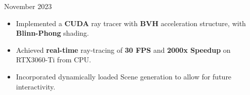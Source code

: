 \documentclass[10pt,a4paper,ragged2e,withhyper]{altacv}
\begin{document}
\begin{paracol}{2}












    {November 2023 
    }{}
    \begin{itemize}
        \item Implemented a \textbf{CUDA} ray tracer with \textbf{BVH} acceleration structure, with \textbf{Blinn-Phong} shading.
        \item Achieved \textbf{real-time} ray-tracing of \textbf{30 FPS} and \textbf{2000x Speedup} on RTX3060-Ti from CPU.
        \item Incorporated dynamically loaded Scene generation to allow for future interactivity.
    \end{itemize}


\end{paracol}
\end{document}
